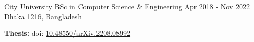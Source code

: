 

\begin{cventries}

  \cventry
    {\href{https://www.cityuniversity.edu.bd/}{City University}} %
    {BSc in Computer Science \& Engineering} %
    {Apr 2018 - Nov 2022} %
    {Dhaka 1216, Bangladesh} %
  {
    \begin{cvitems}
      \item \textbf{Thesis:}  doi: \href{https://doi.org/10.48550/arXiv.2208.08992}{\textcolor{Cerulean}{10.48550/arXiv.2208.08992}}
    \end{cvitems}
  }


    
 
\end{cventries}
